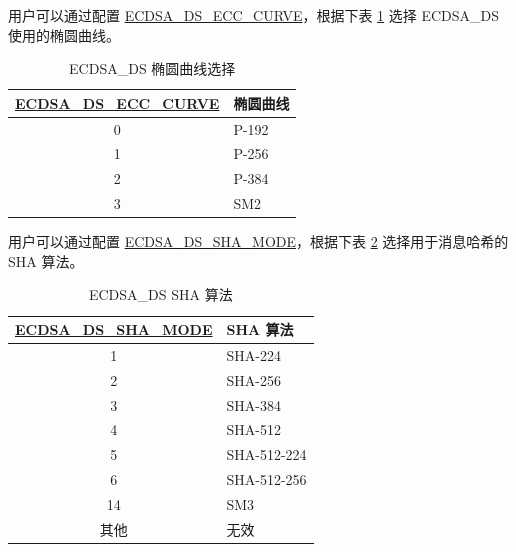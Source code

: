 \documentclass[main\_\_CN.tex]{subfiles}
\begin{document}
用户可以通过配置 \hyperref[fielddesc:ECDSADSECCCURVE]{ECDSA\_DS\_ECC\_CURVE}，根据下表 \ref{tab:ecdsa-curve-selection} 选择 ECDSA\_DS 使用的椭圆曲线。

\begin{table}[H]
    \centering
    \caption{ECDSA\_DS 椭圆曲线选择}
    \label{tab:ecdsa-curve-selection}
    \begin{tabular}{ | c | l | }
    \hline
        \rowcolor{lightgray}
        \textbf{\hyperref[fielddesc:ECDSADSECCCURVE]{ECDSA\_DS\_ECC\_CURVE}}      & \textbf{椭圆曲线}\\
        \hline
        0                       & P-192    \\\hline
        1                       & P-256    \\\hline
        2                       & P-384    \\\hline
        3                       & SM2      \\\hline
    \end{tabular}
\end{table}

用户可以通过配置 \hyperref[fielddesc:ECDSADSSHAMODE]{ECDSA\_DS\_SHA\_MODE}，根据下表 \ref{tab:ecdsa-sha-algorithms} 选择用于消息哈希的 SHA 算法。

\begin{table}[H]
    \centering
    \caption{ECDSA\_DS SHA 算法}
    \label{tab:ecdsa-sha-algorithms}
    \begin{tabular}{ | c | l | }
    \hline
        \rowcolor{lightgray}
        \textbf{\hyperref[fielddesc:ECDSADSSHAMODE]{ECDSA\_DS\_SHA\_MODE}}      & \textbf{SHA 算法}\\
        \hline
        1                       & SHA-224    \\\hline
        2                       & SHA-256    \\\hline
        3                       & SHA-384    \\\hline
        4                       & SHA-512    \\\hline
        5                       & SHA-512-224    \\\hline
        6                       & SHA-512-256    \\\hline
        14                      & SM3        \\\hline
        其他                  & 无效    \\\hline
    \end{tabular}
\end{table}
\end{document}
